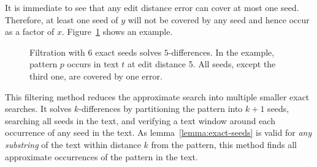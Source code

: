 It is immediate to see that any edit distance error can cover at most one seed.
Therefore, at least one seed of $y$ will not be covered by any seed and hence occur as a factor of $x$.
Figure~\ref{fig:seeds-ext} shows an example.

\begin{figure}[h]
\begin{center}
\caption[Filtration with exact seeds]{Filtration with 6 exact seeds solves $5$-differences. In the example, pattern $p$ occurs in text $t$ at edit distance 5. All seeds, except the third one, are covered by one error.}
\label{fig:seeds-ext}

\end{center}
\end{figure}

This filtering method reduces the approximate search into multiple smaller exact searches.
It solves $k$-differences by partitioning the pattern into $k+1$ seeds, searching all seeds in the text, and verifying a text window around each occurrence of any seed in the text.
As lemma~\ref{lemma:exact-seeds} is valid for \emph{any substring} of the text within distance $k$ from the pattern, this method finds all approximate occurrences of the pattern in the text.

